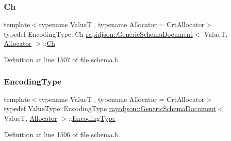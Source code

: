 \subsubsection{\texorpdfstring{Ch}{Ch}}
{\footnotesize\ttfamily template$<$typename ValueT , typename Allocator  = Crt\+Allocator$>$ \\
typedef Encoding\+Type\+::\+Ch \mbox{\hyperlink{classrapidjson_1_1_generic_schema_document}{rapidjson\+::\+Generic\+Schema\+Document}}$<$ ValueT, \mbox{\hyperlink{classrapidjson_1_1_allocator}{Allocator}} $>$\+::\mbox{\hyperlink{classrapidjson_1_1_generic_schema_document_af9b82162834b30bdcbe93cb065d0aedd}{Ch}}}



Definition at line 1507 of file schema.\+h.

\mbox{\label{classrapidjson_1_1_generic_schema_document_a019035fd281ca52874ed434ce4f7d4d8}} 
\subsubsection{\texorpdfstring{EncodingType}{EncodingType}}
{\footnotesize\ttfamily template$<$typename ValueT , typename Allocator  = Crt\+Allocator$>$ \\
typedef Value\+Type\+::\+Encoding\+Type \mbox{\hyperlink{classrapidjson_1_1_generic_schema_document}{rapidjson\+::\+Generic\+Schema\+Document}}$<$ ValueT, \mbox{\hyperlink{classrapidjson_1_1_allocator}{Allocator}} $>$\+::\mbox{\hyperlink{classrapidjson_1_1_generic_schema_document_a019035fd281ca52874ed434ce4f7d4d8}{Encoding\+Type}}}



Definition at line 1506 of file schema.\+h.

\mbox{\label{classrapidjson_1_1_generic_schema_document_ab2764f2258889b3262eff6293d7ca015}} 
